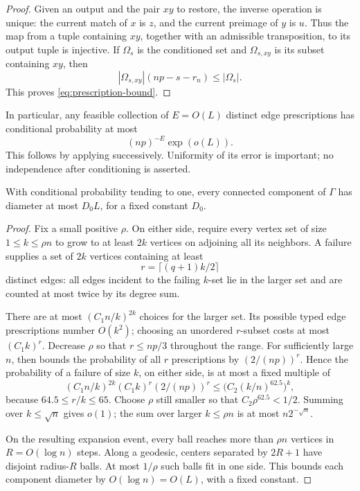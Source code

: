 \begin{proof}
Given an output and the pair \(xy\) to restore, the inverse operation is unique: the current match of \(x\) is \(z\), and the current preimage of \(y\) is \(u\). Thus the map from a tuple containing \(xy\), together with an admissible transposition, to its output tuple is injective. If \(\Omega_s\) is the conditioned set and \(\Omega_{s,xy}\) is its subset containing \(xy\), then
\[
|\Omega_{s,xy}|(np-s-r_n)\le|\Omega_s|.
\]
This proves \eqref{eq:prescription-bound}.
\end{proof}

In particular, any feasible collection of \(E=O(L)\) distinct edge prescriptions has conditional probability at most
\begin{equation}\label{eq:few-edge-bound}
 (np)^{-E}\exp(o(L)).
\end{equation}
This follows by applying  successively. Uniformity of its error is important; no independence after conditioning is asserted.

\begin{lemma}\label{lem:diameter}
With conditional probability tending to one, every connected component of \(\Gamma\) has diameter at most \(D_0L\), for a fixed constant \(D_0\).
\end{lemma}
\begin{proof}
Fix a small positive \(\rho\). On either side, require every vertex set of size \(1\le k\le\rho n\) to grow to at least \(2k\) vertices on adjoining all its neighbors. A failure supplies a set of \(2k\) vertices containing at least
\[
r=\lceil(q+1)k/2\rceil
\]
distinct edges: all edges incident to the failing \(k\)-set lie in the larger set and are counted at most twice by its degree sum.

There are at most \((C_1n/k)^{2k}\) choices for the larger set. Its possible typed edge prescriptions number \(O(k^2)\); choosing an unordered \(r\)-subset costs at most \((C_1k)^r\). Decrease \(\rho\) so that \(r\le np/3\) throughout the range. For sufficiently large \(n\),  then bounds the probability of all \(r\) prescriptions by \((2/(np))^r\). Hence the probability of a failure of size \(k\), on either side, is at most a fixed multiple of
\[
(C_1n/k)^{2k}(C_1k)^r(2/(np))^r
 \le \bigl(C_2(k/n)^{62.5}\bigr)^k,
\]
because \(64.5\le r/k\le65\). Choose \(\rho\) still smaller so that \(C_2\rho^{62.5}<1/2\). Summing over \(k\le\sqrt n\) gives \(o(1)\); the sum over larger \(k\le\rho n\) is at most \(n2^{-\sqrt n}\).

On the resulting expansion event, every ball reaches more than \(\rho n\) vertices in \(R=O(\log n)\) steps. Along a geodesic, centers separated by \(2R+1\) have disjoint radius-\(R\) balls. At most \(1/\rho\) such balls fit in one side. This bounds each component diameter by \(O(\log n)=O(L)\), with a fixed constant.
\end{proof}
